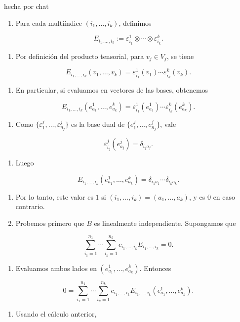 \begin{bookproof}{hecha por chat}
\begin{enumerate}
\item Para cada multiíndice $(i_1,\ldots,i_k)$, definimos
\end{enumerate}
\[
E_{i_1,\ldots,i_k}:=\varepsilon^1_{i_1}\otimes\cdots\otimes\varepsilon^k_{i_k}.
\]
\begin{enumerate}[start=2]
\item Por definición del producto tensorial, para $v_j\in V_j$, se tiene
\end{enumerate}
\[
E_{i_1,\ldots,i_k}(v_1,\ldots,v_k)=\varepsilon^1_{i_1}(v_1)\cdots\varepsilon^k_{i_k}(v_k).
\]
\begin{enumerate}[start=3]
\item En particular, si evaluamos en vectores de las bases, obtenemos
\end{enumerate}
\[
E_{i_1,\ldots,i_k}(e^1_{a_1},\ldots,e^k_{a_k})=\varepsilon^1_{i_1}(e^1_{a_1})\cdots\varepsilon^k_{i_k}(e^k_{a_k}).
\]
\begin{enumerate}[start=4]
\item Como $\{\varepsilon^j_1,\ldots,\varepsilon^j_{n_j}\}$ es la base dual de $\{e^j_1,\ldots,e^j_{n_j}\}$, vale
\end{enumerate}
\[
\varepsilon^j_{i_j}(e^j_{a_j})=\delta_{i_ja_j}.
\]
\begin{enumerate}[start=5]
\item Luego
\end{enumerate}
\[
E_{i_1,\ldots,i_k}(e^1_{a_1},\ldots,e^k_{a_k})=\delta_{i_1a_1}\cdots\delta_{i_ka_k}.
\]
\begin{enumerate}[start=6]
\item Por lo tanto, este valor es $1$ si $(i_1,\ldots,i_k)=(a_1,\ldots,a_k)$, y es $0$ en caso contrario.
\item Probemos primero que $B$ es linealmente independiente. Supongamos que
\end{enumerate}
\[
\sum_{i_1=1}^{n_1}\cdots\sum_{i_k=1}^{n_k}c_{i_1,\ldots,i_k}E_{i_1,\ldots,i_k}=0.
\]
\begin{enumerate}[start=8]
\item Evaluamos ambos lados en $(e^1_{a_1},\ldots,e^k_{a_k})$. Entonces
\end{enumerate}
\[
0=\sum_{i_1=1}^{n_1}\cdots\sum_{i_k=1}^{n_k}c_{i_1,\ldots,i_k}E_{i_1,\ldots,i_k}(e^1_{a_1},\ldots,e^k_{a_k}).
\]
\begin{enumerate}[start=9]
\item Usando el cálculo anterior,

\end{enumerate}
\end{bookproof}
